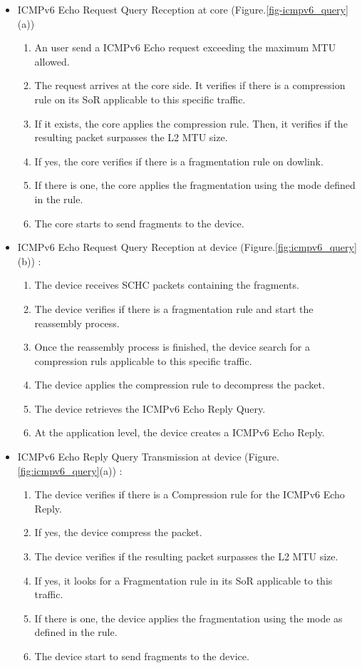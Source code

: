 \begin{itemize}
    \item ICMPv6 Echo Request Query Reception at core (Figure.\ref{fig-icmpv6_query}(a))
\begin{enumerate}
    \item An user send a ICMPv6 Echo request exceeding the maximum MTU allowed.
    \item The request arrives at the core side. It verifies if there is a compression rule on its SoR applicable to this specific traffic.
    \item If it exists, the core applies the compression rule. 
    Then, it verifies if the resulting packet surpasses the L2 MTU size.
    \item If yes, the core verifies if there is a fragmentation rule on dowlink.
    \item If there is one, the core applies the fragmentation using the mode defined in the rule.
    \item The core starts to send fragments to the device.
    \end{enumerate}

\item ICMPv6 Echo Request Query Reception at device (Figure.\ref{fig:icmpv6_query}(b)) : 
\begin{enumerate}
    \item The device receives SCHC packets containing the fragments.
    \item The device verifies if there is a fragmentation rule and start the reassembly process.
    \item Once the reassembly process is finished, the device search for a compression ruls applicable to this specific traffic.
    \item The device applies the compression rule to decompress the packet.
    \item The device retrieves the ICMPv6 Echo Reply Query.
    \item At the application level, the device creates a ICMPv6 Echo Reply.
\end{enumerate}

\item ICMPv6 Echo Reply Query Transmission at device (Figure.\ref{fig:icmpv6_query}(a)) : 
\begin{enumerate}
    \item The device verifies if there is a Compression rule for the ICMPv6 Echo Reply.
    \item If yes, the device compress the packet.
    \item The device verifies if the resulting packet surpasses the L2 MTU size.
    \item If yes, it looks for a Fragmentation rule in its SoR applicable to this traffic.
    \item If there is one, the device applies the fragmentation using the mode as defined in the rule.
    \item The device start to send fragments to the device.
\end{enumerate}


\end{itemize}
